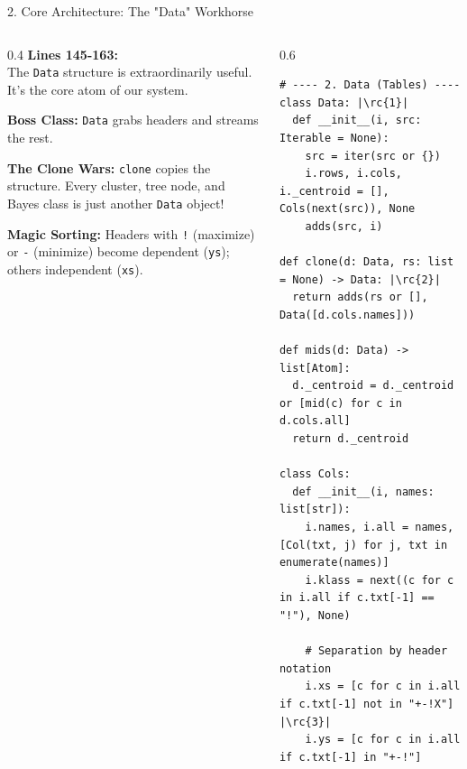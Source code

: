\begin{frame}[fragile]{2. Core Architecture: The "Data" Workhorse}
\begin{columns}[T]
  \begin{column}{0.4\textwidth}
    \footnotesize 
    \textbf{Lines 145-163:}\\
    The \texttt{Data} structure is extraordinarily useful. It's the core atom of our system.

    \vspace{0.2cm}
     \textbf{Boss Class:} \texttt{Data} grabs headers and streams the rest.
    
    \vspace{0.15cm}
     \textbf{The Clone Wars:} \texttt{clone} copies the structure. Every cluster, tree node, and Bayes class is just another \texttt{Data} object!

    \vspace{0.15cm}
     \textbf{Magic Sorting:} Headers with \texttt{!} (maximize) or \texttt{-} (minimize) become dependent (\texttt{ys}); others independent (\texttt{xs}).
  \end{column}
  
  \begin{column}{0.6\textwidth}
\begin{verbatim}
# ---- 2. Data (Tables) ----
class Data: |\rc{1}|
  def __init__(i, src: Iterable = None):
    src = iter(src or {})
    i.rows, i.cols, i._centroid = [], Cols(next(src)), None
    adds(src, i)

def clone(d: Data, rs: list = None) -> Data: |\rc{2}|
  return adds(rs or [], Data([d.cols.names]))

def mids(d: Data) -> list[Atom]:
  d._centroid = d._centroid or [mid(c) for c in d.cols.all]
  return d._centroid

class Cols:
  def __init__(i, names: list[str]):
    i.names, i.all = names, [Col(txt, j) for j, txt in enumerate(names)]
    i.klass = next((c for c in i.all if c.txt[-1] == "!"), None)
    
    # Separation by header notation
    i.xs = [c for c in i.all if c.txt[-1] not in "+-!X"] |\rc{3}|
    i.ys = [c for c in i.all if c.txt[-1] in "+-!"]
\end{verbatim}
  \end{column}
\end{columns}
\end{frame}

